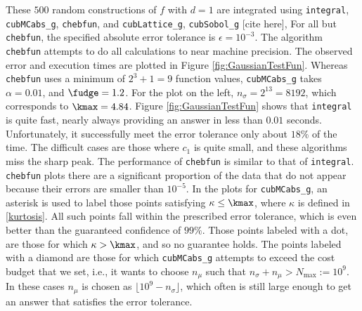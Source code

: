 \documentclass{iitthesis}
\begin{document}
These $500$ random constructions of $f$ with $d=1$ are integrated using {\tt integral},  {\tt cubMCabs\_g}, {\tt chebfun}, and {\tt cubLattice\_g}, {\tt cubSobol\_g} [cite here], 
%
For all but {\tt chebfun}, the specified absolute error tolerance is $\epsilon=10^{-3}$.  The algorithm {\tt chebfun} attempts to do all calculations to near machine precision.  The observed error and execution times are plotted in Figure \ref{fig:GaussianTestFun}.  Whereas {\tt chebfun} uses a minimum of $2^3+1=9$ function values, {\tt cubMCabs\_g}  takes $\alpha=0.01$, and $\fudge=1.2$.  For the plot on the left, $n_\sigma=2^{13}=8192$, which corresponds to  $\kmax=4.84$. 
%
Figure \ref{fig:GaussianTestFun} shows that {\tt integral} is quite fast, nearly always providing an answer in less than $0.01$ seconds.  Unfortunately, it successfully meet the error tolerance only about $18\%$ of the time.  The difficult cases are those where $c_1$ is quite small, and these algorithms miss the sharp peak.  The performance of {\tt chebfun} is similar to that of {\tt integral}. {\tt chebfun} plots there are a significant proportion of the data that do not appear because their errors are smaller than $10^{-5}$.
%
In the plots for {\tt cubMCabs\_g}, an asterisk is used to label those points satisfying $\kappa \le \kmax$, where $\kappa$ is defined in \eqref{kurtosis}. All such points fall within the prescribed error tolerance,
which is even better than the guaranteed confidence of $99\%$.  Those points labeled with a dot, are those for which $\kappa > \kmax$, and so no guarantee holds. The points labeled with a diamond are those for which  {\tt cubMCabs\_g}  attempts to exceed the cost budget that we set, i.e., it wants to choose $n_\mu$ such that $n_{\sigma}+n_\mu > N_{\max}:=10^9$. In these cases $n_\mu$ is chosen as $\lfloor 10^9 - n_\sigma \rfloor$, which often is still large enough to get an answer that satisfies the error tolerance. 
\end{document}
